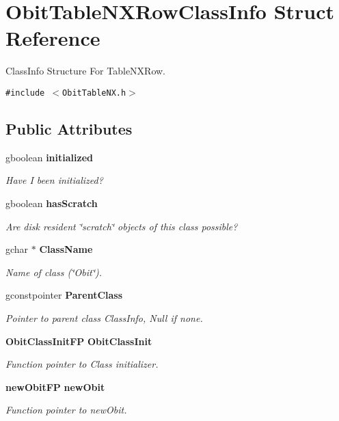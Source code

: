\section{Obit\-Table\-NXRow\-Class\-Info Struct Reference}
\label{structObitTableNXRowClassInfo}
Class\-Info Structure For Table\-NXRow.  


{\tt \#include $<$Obit\-Table\-NX.h$>$}

\subsection*{Public Attributes}
\begin{CompactItemize}
\item 
gboolean {\bf initialized}
\begin{CompactList}\small\item\em Have I been initialized? \item\end{CompactList}\item 
gboolean {\bf has\-Scratch}
\begin{CompactList}\small\item\em Are disk resident \char`\"{}scratch\char`\"{} objects of this class possible? \item\end{CompactList}\item 
gchar $\ast$ {\bf Class\-Name}
\begin{CompactList}\small\item\em Name of class (\char`\"{}Obit\char`\"{}). \item\end{CompactList}\item 
gconstpointer {\bf Parent\-Class}
\begin{CompactList}\small\item\em Pointer to parent class Class\-Info, Null if none. \item\end{CompactList}\item 
{\bf Obit\-Class\-Init\-FP} {\bf Obit\-Class\-Init}
\begin{CompactList}\small\item\em Function pointer to Class initializer. \item\end{CompactList}\item 
{\bf new\-Obit\-FP} {\bf new\-Obit}
\begin{CompactList}\small\item\em Function pointer to new\-Obit. \item\end{CompactList}\item 

\end{CompactItemize}
